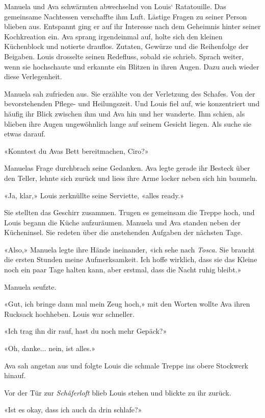 Manuela und Ava schwärmten abwechselnd von Louis` Ratatouille. Das
gemeinsame Nachtessen verschaffte ihm Luft. Lästige Fragen zu seiner
Person blieben aus. Entspannt ging er auf ihr Interesse nach dem
Geheimnis hinter seiner Kochkreation ein. Ava sprang irgendeinmal auf,
holte sich den kleinen Küchenblock und notierte drauflos. Zutaten,
Gewürze und die Reihenfolge der Beigaben. Louis drosselte seinen
Redefluss, sobald sie schrieb. Sprach weiter, wenn sie hochschaute und
erkannte ein Blitzen in ihren Augen. Dazu auch wieder diese
Verlegenheit.

Manuela sah zufrieden aus. Sie erzählte von der Verletzung des Schafes.
Von der bevorstehenden Pflege- und Heilungszeit. Und Louis fiel auf, wie
konzentriert und häufig ihr Blick zwischen ihm und Ava hin und her
wanderte. Ihm schien, als blieben ihre Augen ungewöhnlich lange auf
seinem Gesicht liegen. Als suche sie etwas darauf.

«Konntest du Avas Bett bereitmachen, Ciro?»

Manuelas Frage durchbrach seine Gedanken. Ava legte gerade ihr Besteck
über den Teller, lehnte sich zurück und liess ihre Arme locker neben
sich hin baumeln.

«Ja, klar,» Louis zerknüllte seine Serviette, «alles ready.»

Sie stellten das Geschirr zusammen. Trugen es gemeinsam die Treppe hoch,
und Louis begann die Küche aufzuräumen. Manuela und Ava standen neben
der Kücheninsel. Sie redeten über die anstehenden Aufgaben der nächsten
Tage.

«Also,» Manuela legte ihre Hände ineinander, «ich sehe nach
\emph{Tosca.} Sie braucht die ersten Stunden meine Aufmerksamkeit. Ich
hoffe wirklich, dass sie das Kleine noch ein paar Tage halten kann, aber
erstmal, dass die Nacht ruhig bleibt.»

Manuela seufzte.

«Gut, ich bringe dann mal mein Zeug hoch,» mit den Worten wollte Ava
ihren Rucksack hochheben. Louis war schneller.

«Ich trag ihn dir rauf, hast du noch mehr Gepäck?»

«Oh, danke... nein, ist alles.»

Ava sah angetan aus und folgte Louis die schmale Treppe ins obere
Stockwerk hinauf.

Vor der Tür zur \emph{Schäferloft} blieb Louis stehen und blickte zu ihr
zurück.

«Ist es okay, dass ich auch da drin schlafe?»


